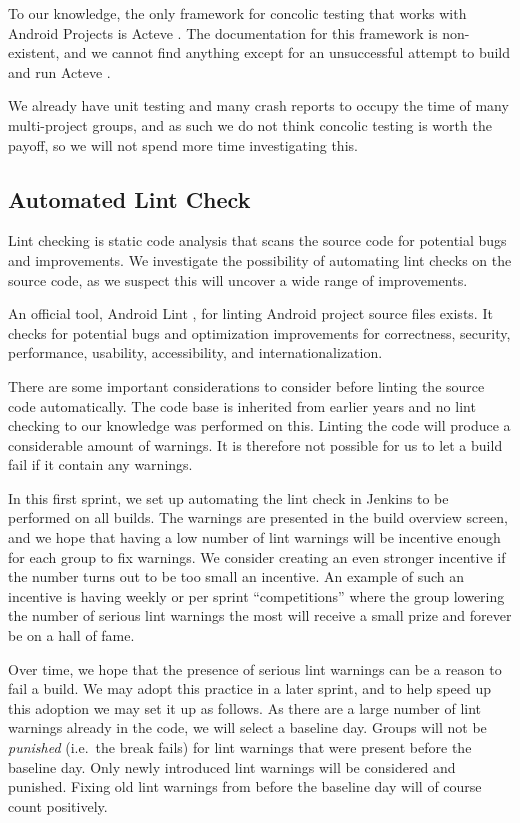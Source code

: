To our knowledge, the only framework for concolic testing that works with Android Projects is Acteve \parencite{AnandNHY12, AnandH11}. The documentation for this framework is non-existent, and we cannot find anything except for an unsuccessful attempt to build and run Acteve \parencite{chenxiong-acteve}.

We already have unit testing and many crash reports to occupy the time of many multi-project groups, and as such we do not think concolic testing is worth the payoff, so we will not spend more time investigating this.

\subsection{Automated Lint Check}\label{sec:automated_lint}
Lint checking is static code analysis that scans the source code for potential bugs and improvements. We investigate the possibility of automating lint checks on the source code, as we suspect this will uncover a wide range of improvements.

An official tool, Android Lint \parencite{AndroidLint}, for linting Android project source files exists. It checks for potential bugs and optimization improvements for correctness, security, performance, usability, accessibility, and internationalization.

There are some important considerations to consider before linting the source code automatically. The code base is inherited from earlier years and no lint checking to our knowledge was performed on this. Linting the code will produce a considerable amount of warnings. It is therefore not possible for us to let a build fail if it contain any warnings.

In this first sprint, we set up automating the lint check in Jenkins to be performed on all builds. The warnings are presented in the build overview screen, and we hope that having a low number of lint warnings will be incentive enough for each group to fix warnings. We consider creating an even stronger incentive if the number turns out to be too small an incentive. An example of such an incentive is having weekly or per sprint ``competitions'' where the group lowering the number of serious lint warnings the most will receive a small prize and forever be on a hall of fame.

Over time, we hope that the presence of serious lint warnings can be a reason to fail a build. We may adopt this practice in a later sprint, and to help speed up this adoption we may set it up as follows. As there are a large number of lint warnings already in the code, we will select a baseline day. Groups will not be \emph{punished} (i.e.\ the break fails) for lint warnings that were present before the baseline day. Only newly introduced lint warnings will be considered and punished. Fixing old lint warnings from before the baseline day will of course count positively.

